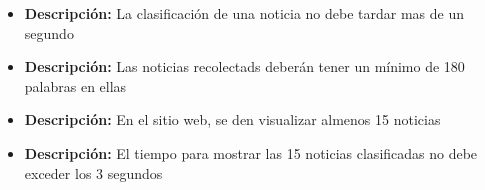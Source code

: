 


    \begin{itemize}
      \item \textbf{Descripción:} La clasificación de una noticia no debe tardar mas de un segundo\\
    \end{itemize}

    \begin{itemize}
     \item \textbf{Descripción:} Las noticias recolectads deberán tener un mínimo de 180 palabras en ellas\\
    \end{itemize}

    \begin{itemize}
      \item \textbf{Descripción:} En el sitio web, se den visualizar almenos 15 noticias\\
    \end{itemize}

    \begin{itemize}
      \item \textbf{Descripción:} El tiempo para mostrar las 15 noticias clasificadas no debe exceder los 3 segundos\\
    \end{itemize}
